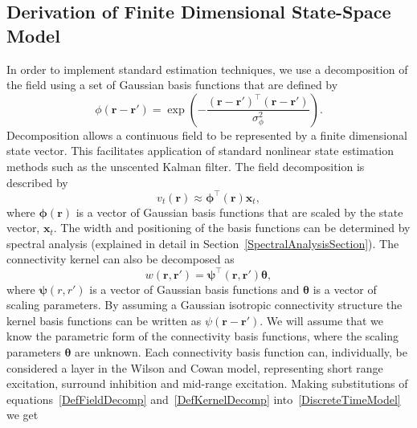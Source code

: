 \documentclass[10pt,a4paper]{article}
\begin{document}
\subsection{Derivation of Finite Dimensional State-Space Model} 
In order to implement standard estimation techniques, we use a decomposition of the field using a set of Gaussian basis functions that are defined by
\begin{equation}\label{eq:FieldBasisFunction}
	\phi\left(\mathbf{r}-\mathbf{r}'\right) =
\exp{\left(-\frac{(\mathbf{r}-\mathbf{r}')^\top(\mathbf{r}-\mathbf{r}')}{\sigma_{\phi}^2}\right)}. 
\end{equation}
Decomposition allows a continuous field to be represented by a finite dimensional state vector. This facilitates application of standard nonlinear state estimation methods such as the unscented Kalman filter. The field decomposition is described by 
\begin{equation}
	\label{DefFieldDecomp} v_t\left(\mathbf{r}\right) \approx \boldsymbol{\phi}^{\top}\left(\mathbf{r}\right) \mathbf{x}_t, 
\end{equation}
where $\mathbf{\boldsymbol{\phi}}(\mathbf{r})$ is a vector of Gaussian basis functions that are scaled by the state vector, $\mathbf{x}_t$. %
The width and positioning of the basis functions can be determined by spectral analysis (explained in detail in Section~\ref{SpectralAnalysisSection}). The connectivity kernel can also be decomposed as 
\begin{equation}\label{DefKernelDecomp}
	 w\left(\mathbf{r},\mathbf{r}'\right) =\boldsymbol{\psi}^\top\left(\mathbf{r},\mathbf{r}'\right) \boldsymbol{\theta},
\end{equation}
where $\boldsymbol{\psi}(r,r')$ is a vector of Gaussian basis functions and $\boldsymbol{\theta}$ is a vector of scaling parameters. By assuming a Gaussian isotropic connectivity structure the kernel basis functions can be written as $\psi(\mathbf{r}-\mathbf{r}')$. We will assume that we know the parametric form of the connectivity basis functions, where the scaling parameters $\boldsymbol{\theta}$ are unknown. Each connectivity basis function can, individually, be considered a layer in the Wilson and Cowan model, representing short range excitation, surround inhibition and mid-range excitation. Making substitutions of equations~\ref{DefFieldDecomp} and~\ref{DefKernelDecomp} into~\ref{DiscreteTimeModel} we get 
\end{document}
